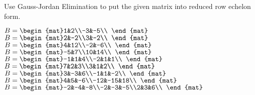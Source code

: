

\begin{Exercise}[
name={},
title={}, 
difficulty=0,
origin={\cite{GH}}]
Use Gauss-Jordan Elimination to put the given matrix into reduced row echelon form.
\begin{multicols}{2}
\Question $B = \begin{mat}1&2\\-3&-5\\ \end{mat}$
\Question $B = \begin{mat}2&-2\\3&-2\\ \end{mat}$
\Question $B = \begin{mat}4&12\\-2&-6\\ \end{mat}$
\Question $B = \begin{mat}-5&7\\10&14\\ \end{mat}$
\Question $B = \begin{mat}-1&1&4\\-2&1&1\\ \end{mat}$
\Question $B = \begin{mat}7&2&3\\3&1&2\\ \end{mat}$
\Question $B = \begin{mat}3&-3&6\\-1&1&-2\\ \end{mat}$
\Question $B = \begin{mat}4&5&-6\\-12&-15&18\\ \end{mat}$
\Question $B = \begin{mat}-2&-4&-8\\-2&-3&-5\\2&3&6\\ \end{mat}$

\end{multicols}
\end{Exercise}
